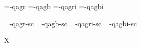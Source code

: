 

\ifx\sizespec\undefined \def\sizespec{}\fi
\ifx\font\corkencoded {}\else {}\fi

\ifx\font\unicoded  {} 
\else

\font\tenrm=\tmp-qagr  \sizespec
\font\tenbf=\tmp-qagb  \sizespec
\font\tenit=\tmp-qagri \sizespec
\font\tenbi=\tmp-qagbi \sizespec

\font\tenrmc=\tmp-qagr-sc  \sizespec
\font\tenbfc=\tmp-qagb-sc  \sizespec
\font\tenitc=\tmp-qagri-sc \sizespec
\font\tenbic=\tmp-qagbi-sc \sizespec

\fi

\tenrm

\ifx\regfontdefault\undefined \else
   \regfontdefault
   \regfont\tenrmc \regfont\tenitc
   \regfont\tenbfc \regfont\tenbic
\fi

\def\caps#1{{\escapechar=-1 \expandafter}%
  \expandafter\csname\expandafter\tenonlytext\string#1c\endcsname}
\def\tenonlytext{ten}

\ifx\font\corkencoded\else \ifx\font\unicoded\else  \fi\fi

\ifx\mathpreloaded X\else  \fi                     


